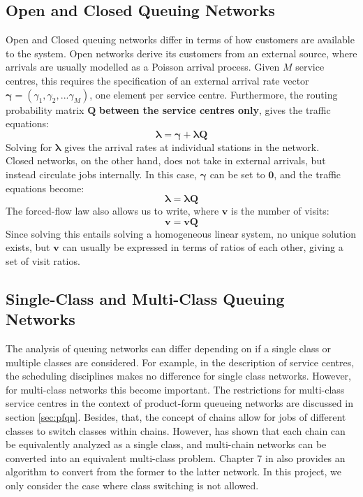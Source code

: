 \subsection{Open and Closed Queuing Networks}

Open and Closed queuing networks differ in terms of how customers are available to the system. Open networks derive its customers from an external source, where arrivals are usually modelled as a Poisson arrival process. Given \(M\) service centres, this requires the specification of an external arrival rate vector \(\boldsymbol{\gamma} = (\gamma_1, \gamma_2, ... \gamma_M)\), one element per service centre. Furthermore, the routing probability matrix \(\mathbf{Q}\) \textbf{between the service centres only}, gives the traffic equations:
\[\boldsymbol{\lambda} = \boldsymbol{\gamma} + \boldsymbol{\lambda}\mathbf{Q}\]
Solving for \(\boldsymbol{\lambda}\) gives the arrival rates at individual stations in the network. \\
Closed networks, on the other hand, does not take in external arrivals, but instead circulate jobs internally. In this case, \(\boldsymbol{\gamma}\) can be set to \(\mathbf{0}\), and the traffic equations become:
\[\boldsymbol{\lambda} = \boldsymbol{\lambda}\mathbf{Q}\]
The forced-flow law also allows us to write, where \(\mathbf{v}\) is the number of visits:
\[\mathbf{v} = \mathbf{v}\mathbf{Q}\]
Since solving this entails solving a homogeneous linear system, no unique solution exists, but \(\mathbf{v}\) can usually be expressed in terms of ratios of each other, giving a set of visit ratios.

\subsection{Single-Class and Multi-Class Queuing Networks}
The analysis of queuing networks can differ depending on if a single class or multiple classes are considered. For example, in the description of service centres, the scheduling disciplines makes no difference for single class networks. However, for multi-class networks this become important. The restrictions for multi-class service centres in the context of product-form queueing networks are discussed in section \ref{sec:pfqn}. Besides, that, the concept of chains allow for jobs of different classes to switch classes within chains. However, \cite{Zahorjan1979AnNetworks} has shown that each chain can be equivalently analyzed as a single class, and multi-chain networks can be converted into an equivalent multi-class problem. Chapter 7 in \cite{Bolch2006QueueingApplications} also provides an algorithm to convert from the former to the latter network. In this project, we only consider the case where class switching is not allowed.

